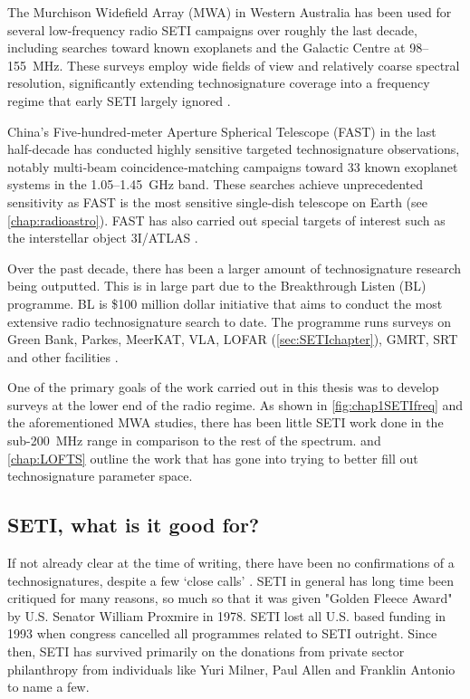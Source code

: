The Murchison Widefield Array (MWA) in Western Australia has been used for several low‑frequency radio SETI campaigns over roughly the last decade, including searches toward known exoplanets and the Galactic Centre at 98–155~MHz. These surveys employ wide fields of view and relatively coarse spectral resolution, significantly extending technosignature coverage into a frequency regime that early SETI largely ignored \citep{tingay:anticenter,tingay:omm,tremblay_seti_2020}.

China’s Five‑hundred‑meter Aperture Spherical Telescope (FAST) in the last half-decade has conducted highly sensitive targeted technosignature observations, notably multi‑beam coincidence‑matching campaigns toward 33 known exoplanet systems in the 1.05–1.45~GHz band. These searches achieve unprecedented sensitivity as FAST is the most sensitive single-dish telescope on Earth (see \cref{chap:radioastro}). FAST has also carried out special targets of interest such as the interstellar object 3I/ATLAS \citep{ZhiZhang_2020_FAST_ApJ, qian:2018}. 

Over the past decade, there has been a larger amount of technosignature research being outputted. This is in large part due to the Breakthrough Listen (BL) programme. BL is \$100 million dollar initiative that aims to conduct the most extensive radio technosignature search to date. The programme runs surveys on Green Bank, Parkes, MeerKAT, VLA, LOFAR (\cref{sec:SETIchapter}), GMRT, SRT and other facilities \citep{Sheikh_2020, Gajjar_2021_BLGC1, danny-parkes, Enriquez:2017, gsc+19}. 

One of the primary goals of the work carried out in this thesis was to develop surveys at the lower end of the radio regime. As shown in \cref{fig:chap1SETIfreq} and the aforementioned MWA studies, there has been little SETI work done in the sub-200~MHz range in comparison to the rest of the spectrum.  and \cref{chap:LOFTS} outline the work that has gone into trying to better fill out technosignature parameter space. 

\subsection{SETI, what is it good for?}

If not already clear at the time of writing, there have been no confirmations of a technosignatures, despite a few `close calls' \citep[see.][]{sheikh_analysis_2021, Gray:2008ws}. SETI in general has long time been critiqued for many reasons, so much so that it was given "Golden Fleece Award" by U.S. Senator William Proxmire in 1978. SETI lost all U.S. based funding in 1993 when congress cancelled all programmes related to SETI outright. Since then, SETI has survived primarily on the donations from private sector philanthropy from individuals like Yuri Milner, Paul Allen and Franklin Antonio to name a few. 

